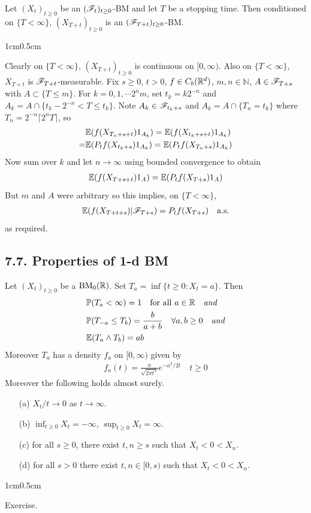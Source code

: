 \documentclass[12pt,a4paper]{report}
\newenvironment{proof}
{\begin{changemargin}{1cm}{0.5cm} 
	}%
	{\end{changemargin}
}
\begin{document}
 Let $(X_t)_{t\geq 0}$ be an $(\mathscr{F}_t)_{t\geq 0}$-BM and let $T$ be a stopping time. Then conditioned on $\{T<\infty \}$, $(X_{T+t})_{t\geq 0}$ is an $(\mathscr{F}_{T+t})_{t\geq 0}$-BM.
\begin{proof}
\pf Clearly on $\{T<\infty \}$, $(X_{T+t})_{t\geq 0}$ is continuous on $[0,\infty)$. Also on $\{T<\infty \}$, $X_{T+t}$ is $\mathscr{F}_{T+t}$-measurable. Fix $s\geq 0$, $t>0$, $f\in C_b(\mathbb{R}^d)$, $m,n\in \mathbb{N}$, $A\in \mathscr{F}_{T+s}$ with $A\subset \{T\leq m\}$. For $k=0,1,\cdots 2^{n}m$, set $t_k = k2^{-n}$ and $A_k = A \cap \{t_k -2^{-n}< T \leq t_k \}$. Note $A_k \in \mathscr{F}_{t_k +s}$ and $A_k = A \cap \{T_n = t_k \}$ where $T_n = 2^{-n} \lceil 2^n T \rceil$, so
\begin{align*}
& \mathbb{E}(f(X_{T_n + s+t}) 1_{A_k}) = \mathbb{E}(f(X_{t_k +s +t}) 1_{A_k}) \\
=& \mathbb{E}(P_t f(X_{t_k+s}) 1_{A_k}) = \mathbb{E}(P_t f(X_{T_n +s}) 1_{A_k})
\end{align*}
Now sum over $k$ and let $n\rightarrow \infty $ using bounded convergence to obtain
\begin{align*}
\mathbb{E}(f(X_{T+s+t})1_A) = \mathbb{E}( P_t f(X_{T+s}) 1_A)
\end{align*}
But $m$ and $A$ were arbitrary so this implies, on $\{ T< \infty \}$,
\begin{align*}
\mathbb{E} (f(X_{T+t+s}) |\mathscr{F}_{T+s}) = P_t f(X_{T+s}) \quad \text{a.s.}
\end{align*}
as required.

\eop
\end{proof}

\subsection*{7.7. Properties of 1-d BM}

 Let $(X_t)_{t\geq 0}$ be a $\text{BM}_0(\mathbb{R})$. Set $T_a = \inf \{t\geq 0 : X_t =a \}$. Then
\begin{align*}
& \mathbb{P}(T_a < \infty) =1 \quad \text{for all } a\in \mathbb{R} \quad \text{\emph{and}} \\
& \mathbb{P}(T_{-a} \leq T_b) = \frac{b}{a+b} \quad \forall a,b\geq 0 \quad \text{\emph{and}} \\
& \mathbb{E}(T_a \wedge T_b) = ab
\end{align*}
Moreover $T_a$ has a density $f_a$ on $[0,\infty)$ given by
\begin{align*}
f_a(t) = \frac{a}{\sqrt{2\pi t^3}} e^{-a^2/2t} \quad t\geq 0
\end{align*}
Moreover the following holds almost surely.
\begin{itemize}
\item[(a)] $X_{t} /t \rightarrow 0$ as $t\rightarrow \infty$.
\item[(b)] $\inf_{t\geq 0} X_t = -\infty$, $\sup_{t\geq 0} X_t =\infty$. 
\item[(c)] for all $s\geq 0$, there exist $t,n\geq s$ such that $X_t < 0 < X_n$.
\item[(d)] for all $s>0$ there exist $t,n \in [0,s)$ such that $X_t < 0<X_n$.
\end{itemize}
\begin{proof}
\pf Exercise.
\end{proof}
\s
\end{document}
